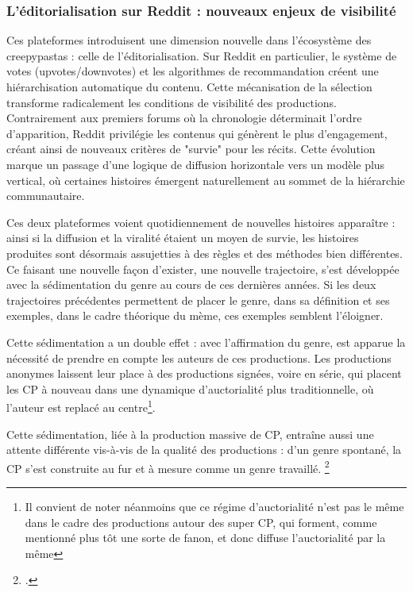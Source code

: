 \documentclass[12pt,a4paper,oneside,titlepage]{book} %
\begin{document}
\subsubsection{L'éditorialisation sur Reddit : nouveaux enjeux de visibilité}

Ces plateformes introduisent une dimension nouvelle dans l'écosystème des creepypastas : celle de l'éditorialisation. Sur Reddit en particulier, le système de votes (upvotes/downvotes) et les algorithmes de recommandation créent une hiérarchisation automatique du contenu. Cette mécanisation de la sélection transforme radicalement les conditions de visibilité des productions. Contrairement aux premiers forums où la chronologie déterminait l'ordre d'apparition, Reddit privilégie les contenus qui génèrent le plus d'engagement, créant ainsi de nouveaux critères de "survie" pour les récits. Cette évolution marque un passage d'une logique de diffusion horizontale vers un modèle plus vertical, où certaines histoires émergent naturellement au sommet de la hiérarchie communautaire.

Ces deux plateformes voient quotidiennement de nouvelles histoires apparaître : ainsi si la diffusion et la viralité étaient un moyen de survie, les histoires produites sont désormais assujetties à des règles et des méthodes bien différentes. Ce faisant une nouvelle façon d'exister, une nouvelle trajectoire, s'est développée avec la sédimentation du genre au cours de ces dernières années. Si les deux trajectoires précédentes permettent de placer le genre, dans sa définition et ses exemples, dans le cadre théorique du mème, ces exemples semblent l'éloigner.

Cette sédimentation a un double effet : avec l'affirmation du genre, est apparue la nécessité de prendre en compte les auteurs de ces productions. Les productions anonymes laissent leur place à des productions signées, voire en série, qui placent les CP à nouveau dans une dynamique d'auctorialité plus traditionnelle, où l'auteur est replacé au centre\footnote{Il convient de noter néanmoins que ce régime d'auctorialité n'est pas le même dans le cadre des productions autour des super CP, qui forment, comme mentionné plus tôt une sorte de fanon, et donc diffuse l'auctorialité par la même}.

Cette sédimentation, liée à la production massive de CP, entraîne aussi une attente différente vis-à-vis de la qualité des productions : d'un genre spontané, la CP s'est construite au fur et à mesure comme un genre travaillé. \footcite{garcia_roca_creepypasta_2021}
\end{document}

